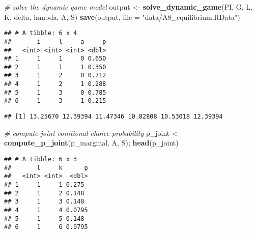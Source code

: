 \documentclass[
]{book}
\newenvironment{Shaded}{\begin{snugshade}}{\end{snugshade}}
\newcommand{\CommentTok}[1]{\textcolor[rgb]{0.56,0.35,0.01}{\textit{#1}}}
\newcommand{\DataTypeTok}[1]{\textcolor[rgb]{0.13,0.29,0.53}{#1}}
\newcommand{\KeywordTok}[1]{\textcolor[rgb]{0.13,0.29,0.53}{\textbf{#1}}}
\newcommand{\NormalTok}[1]{#1}
\newcommand{\OperatorTok}[1]{\textcolor[rgb]{0.81,0.36,0.00}{\textbf{#1}}}
\newcommand{\StringTok}[1]{\textcolor[rgb]{0.31,0.60,0.02}{#1}}
\begin{document}
\begin{Shaded}
\begin{Highlighting}[]
\CommentTok{# solve the dynamic game model}
\NormalTok{output <-}
\StringTok{  }\KeywordTok{solve_dynamic_game}\NormalTok{(PI, G, L, K, delta, lambda, A, S)}
\KeywordTok{save}\NormalTok{(output, }\DataTypeTok{file =} \StringTok{"data/A8_equilibrium.RData"}\NormalTok{)}
\end{Highlighting}
\end{Shaded}

\begin{Shaded}
\end{Shaded}

\begin{verbatim}
## # A tibble: 6 x 4
##       i     l     a     p
##   <int> <int> <int> <dbl>
## 1     1     1     0 0.650
## 2     1     1     1 0.350
## 3     1     2     0 0.712
## 4     1     2     1 0.288
## 5     1     3     0 0.785
## 6     1     3     1 0.215
\end{verbatim}

\begin{Shaded}
\end{Shaded}

\begin{verbatim}
## [1] 13.25670 12.39394 11.47346 10.82808 10.53018 12.39394
\end{verbatim}

\begin{Shaded}
\begin{Highlighting}[]
\CommentTok{# compute joint conitional choice probability}
\NormalTok{p_joint <-}\StringTok{ }\KeywordTok{compute_p_joint}\NormalTok{(p_marginal, A, S); }\KeywordTok{head}\NormalTok{(p_joint)}
\end{Highlighting}
\end{Shaded}

\begin{verbatim}
## # A tibble: 6 x 3
##       l     k      p
##   <int> <int>  <dbl>
## 1     1     1 0.275 
## 2     1     2 0.148 
## 3     1     3 0.148 
## 4     1     4 0.0795
## 5     1     5 0.148 
## 6     1     6 0.0795
\end{verbatim}
\end{document}

